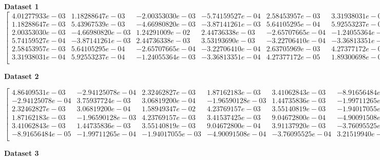 \documentclass{article}
\begin{document}
\noindent\textbf{Dataset 1}
\begin{equation}
    \begin{bmatrix}
        4.01277933e-03 & 1.18288647e-03  & -2.00353030e-03 & -5.74159527e-04 & 2.58453957e-03  & 3.31938031e-04  \\
        1.18288647e-03 & 5.43967539e-03  & -4.66980820e-03 & -3.87141261e-03 & 5.64105295e-04  & 5.92553237e-04  \\
        2.00353030e-03 & -4.66980820e-03 & 1.24291009e-02  & 2.44736338e-03  & -2.65707665e-04 & -1.24055364e-03 \\
        5.74159527e-04 & -3.87141261e-03 & 2.44736338e-03  & 3.53193690e-03  & -3.22706410e-04 & -3.36813351e-04 \\
        2.58453957e-03 & 5.64105295e-04  & -2.65707665e-04 & -3.22706410e-04 & 2.63705969e-03  & 4.27377172e-05  \\
        3.31938031e-04 & 5.92553237e-04  & -1.24055364e-03 & -3.36813351e-04 & 4.27377172e-05  & 1.89300698e-04  \\
    \end{bmatrix}
\end{equation}

\noindent\textbf{Dataset 2}

\begin{equation}
    \begin{bmatrix}
        4.86409531e-03  & -2.94125078e-04 & 2.32462827e-03  & 1.87162183e-03  & 3.41062843e-03  & -8.91656484e-05 \\
        -2.94125078e-04 & 3.75937724e-03  & 3.06819200e-04  & -1.96590128e-03 & 1.44735836e-03  & -1.99711265e-04 \\
        2.32462827e-03  & 3.06819200e-04  & 1.58949347e-02  & 4.23769157e-03  & 3.55140819e-03  & -1.94017055e-03 \\
        1.87162183e-03  & -1.96590128e-03 & 4.23769157e-03  & 3.41537425e-03  & 9.04672800e-04  & -4.90091508e-04 \\
        3.41062843e-03  & 1.44735836e-03  & 3.55140819e-03  & 9.04672800e-04  & 3.91137920e-03  & -3.76095525e-04 \\
        -8.91656484e-05 & -1.99711265e-04 & -1.94017055e-03 & -4.90091508e-04 & -3.76095525e-04 & 3.21519940e-04  \\
    \end{bmatrix}
\end{equation}

\noindent\textbf{Dataset 3}
\end{document}
